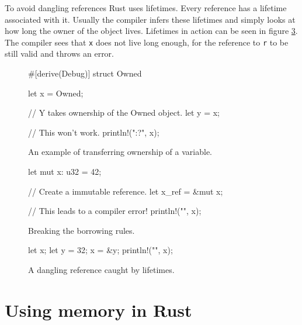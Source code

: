 \documentclass[twocolumn]{article}
\begin{document}
To avoid dangling references Rust uses lifetimes.
Every reference has a lifetime associated with it.
Usually the compiler infers these lifetimes and simply looks at how long the owner of the object lives.
Lifetimes in action can be seen in figure \ref{lifetime-dangling}.
The compiler sees that \texttt{x} does not live long enough, for the reference to \texttt{r} to be still valid and throws an error.
\begin{figure}
\begin{rustcode}
#[derive(Debug)]
struct Owned {}

let x = Owned{};

// Y takes ownership of the Owned object.
let y = x;

// This won't work.
println!("{:?}", x);
\end{rustcode}
\vspace{-2em}
\caption{An example of transferring ownership of a variable.}
\label{ownership-transfer}
\end{figure}
\begin{figure}
\begin{rustcode}
let mut x: u32 = 42;

// Create a immutable reference.
let x_ref = &mut x;

// This leads to a compiler error!
println!("{}", x);
\end{rustcode}
\vspace{-2em}
\caption{Breaking the borrowing rules.}
\label{borrowing}
\end{figure}
\begin{figure}
\begin{rustcode}
let x;
    {
        let y = 32;
        x = &y;
    }
println!("{}", x);
\end{rustcode}
\vspace{-2em}
\caption{A dangling reference caught by lifetimes.}
\label{lifetime-dangling}
\end{figure}
\section{Using memory in Rust}
\end{document}
